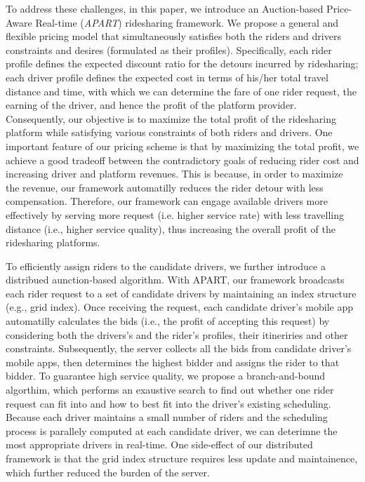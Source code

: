 To address these challenges, in this paper, we introduce an Auction-based Price-Aware Real-time (\textit{APART}) ridesharing framework. We propose a general and flexible pricing model that simultaneously satisfies both the riders and drivers constraints and desires (formulated as their profiles). Specifically, each rider profile defines the expected discount ratio for the detours incurred by ridesharing; each driver profile defines the expected cost in terms of his/her total travel distance and time, with which we can determine the fare of one rider request, the earning of the driver, and hence the profit of the platform provider. Consequently, our objective is to maximize the total profit of the ridesharing platform while satisfying various constraints of both riders and drivers. One important feature of our pricing scheme is that by maximizing the total profit, we achieve a good tradeoff between the contradictory goals of reducing rider cost and increasing driver and platform revenues. This is because, in order to maximize the revenue, our framework automatilly reduces the rider detour with less compensation. Therefore, our framework can engage available drivers more effectively by serving more request (i.e. higher service rate) with less travelling distance (i.e., higher service quality), thus increasing the overall profit of the ridesharing platforms.  

To efficiently assign riders to the candidate drivers, we further introduce a distribued aunction-based algorithm. With APART, our framework broadcasts each rider request to a set of candidate drivers by maintaining an index structure (e.g., grid index). Once receiving the request, each candidate driver's mobile app automatilly calculates the bids (i.e., the profit of accepting this request) by considering both the drivers's and the rider's profiles, their itineriries and other constraints. Subsequently, the server collects all the bids from candidate driver's mobile apps, then determines the highest bidder and assigns the rider to that bidder. To guarantee high service quality, we propose a branch-and-bound algorthim, which performs an exaustive search to find out whether one rider request can fit into and how to best fit into the driver's existing scheduling. Because each driver maintains a small number of riders and the scheduling process is parallely computed at each candidate driver, we can deterimne the most appropriate drivers in real-time. One side-effect of our distributed framework is that the grid index structure requires less update and maintainence, which further reduced the burden of the server.  

